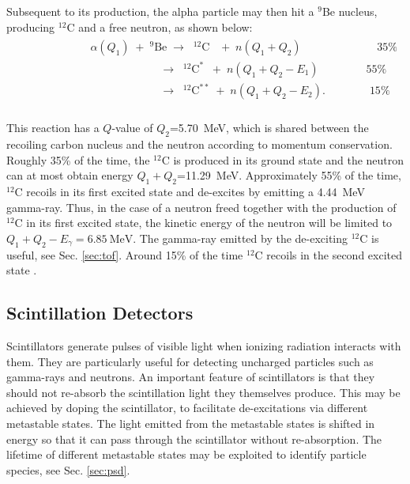 \documentclass[main.tex]{subfiles}
\begin{document}
Subsequent to its production, the alpha particle may then hit a $^{\textrm{9}}$Be nucleus, producing $^{12}$C and a free neutron, as shown below:
\begin{align}
	\begin{split}
		&\phantom{\qquad\qquad\qquad}\alpha(Q_1) \;+\; ^{9}\textrm{Be} \;\rightarrow\;\; ^{12}\textrm{C} \;\;\;+\; n(Q_1+Q_2)\qquad\qquad\qquad\;\;\; 35\%\\
		&\phantom{\qquad\qquad\qquad\qquad\qquad\qquad\;}\rightarrow\;\;^{12}\textrm{C}^* \;\;+\; n(Q_1+Q_2- E_1)\qquad \qquad\; 55\%\\
		&\phantom{\qquad\qquad\qquad\qquad\qquad\qquad\;}\rightarrow\;\;^{12}\textrm{C}^{**} \;+\; n(Q_1+Q_2- E_2).\qquad\qquad 15\%\\
	\label{eq:alphaBe}
	\end{split}
\end{align}

This reaction has a $Q$-value of $Q_2$=\SI{5.70}{\MeV}, which is shared between the recoiling carbon nucleus and the neutron according to momentum conservation. 
Roughly 35\% of the time, the $^{12}$C is produced in its ground state and the neutron can at most obtain energy $Q_1+Q_2$=\SI{11.29}{\MeV}. 
Approximately 55\% of the time, $^{12}$C recoils in its first excited state and de-excites by emitting a \SI{4.44}{\MeV} gamma-ray. 
Thus, in the case of a neutron freed together with the production of $^{12}$C in its first excited state, the kinetic energy of the neutron will be limited to $Q_1+Q_2-E_\gamma=\SI{6.85}{\MeV}$. The gamma-ray emitted by the de-exciting $^{12}$C is useful, see Sec. \ref{sec:tof}.
Around 15\% of the time $^{12}$C recoils in the second excited state \cite{Scherzinger:2015}.
	
\subsection{Scintillation Detectors}
Scintillators generate pulses of visible light when ionizing radiation interacts with them. They are particularly useful for detecting uncharged particles such as gamma-rays and neutrons. An important feature of scintillators is that they should not re-absorb the scintillation light they themselves produce. 
This may be achieved by doping the scintillator, to facilitate de-excitations via different metastable states. 
The light emitted from the metastable states is shifted in energy so that it can pass through the scintillator without re-absorption. The lifetime of different metastable states may be exploited to identify particle species, see Sec. \ref{sec:psd}.
\end{document}
